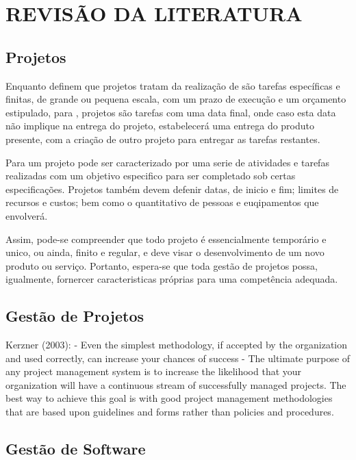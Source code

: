 \chapter{REVISÃO DA LITERATURA}
\thispagestyle{empty}

\section{Projetos}

Enquanto  definem que projetos tratam da realização de são tarefas específicas e finitas, de grande ou pequena escala, com um prazo de execução e um orçamento estipulado, para , projetos são tarefas com uma data final, onde caso esta data não implique na entrega do projeto, estabelecerá uma entrega do produto presente, com a criação de outro projeto para entregar as tarefas restantes.

Para  um projeto pode ser caracterizado por uma serie de atividades e tarefas realizadas com um objetivo especifico para ser completado sob certas especificações. Projetos também devem defenir datas, de inicio e fim; limites de recursos e custos; bem como o quantitativo de pessoas e euqipamentos que envolverá.

Assim, pode-se compreender que todo projeto é essencialmente temporário e unico, ou ainda, finito e regular, e deve visar o desenvolvimento de um novo produto ou serviço. Portanto, espera-se que toda gestão de projetos possa, igualmente, fornercer caracteristicas próprias para uma competência adequada.

\section{Gestão de Projetos}

Kerzner (2003):
- Even the simplest methodology, if accepted by the organization and used correctly, can increase your chances of success
- The ultimate purpose of any project management system is to increase the likelihood that your organization will have a continuous stream of successfully managed projects. The best way to achieve this goal is with good project management methodologies that are based upon guidelines and forms rather than policies and procedures.


\section{Gestão de Software}

